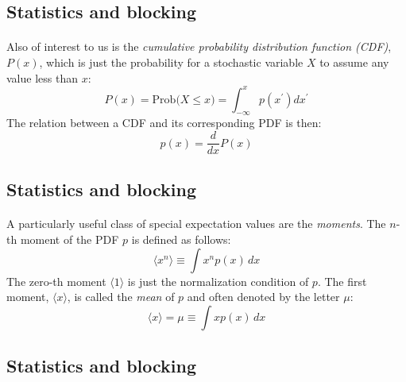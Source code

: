 \documentclass[%
twoside,                 %
final,                   %
10pt]{article}
\begin{document}
\subsection{Statistics and blocking}

\paragraph{}
Also of interest to us is the \emph{cumulative probability distribution function (CDF)}, $P(x)$, which is just the probability
for a stochastic variable $X$ to assume any value less than $x$:
\[
P(x)=\mathrm{Prob(}X\leq x\mathrm{)} =\int_{-\infty}^x p(x^{\prime})dx^{\prime}
\]
The relation between a CDF and its corresponding PDF is then:
\[
p(x) = \frac{d}{dx}P(x)
\]



\subsection{Statistics and blocking}

\paragraph{}
A particularly useful class of special expectation values are the
\emph{moments}. The $n$-th moment of the PDF $p$ is defined as
follows:
\[
\langle x^n\rangle \equiv \int\! x^n p(x)\,dx
\]
The zero-th moment $\langle 1\rangle$ is just the normalization condition of
$p$. The first moment, $\langle x\rangle$, is called the \emph{mean} of $p$
and often denoted by the letter $\mu$:
\[
\langle x\rangle = \mu \equiv \int\! x p(x)\,dx
\]



\subsection{Statistics and blocking}

\end{document}
